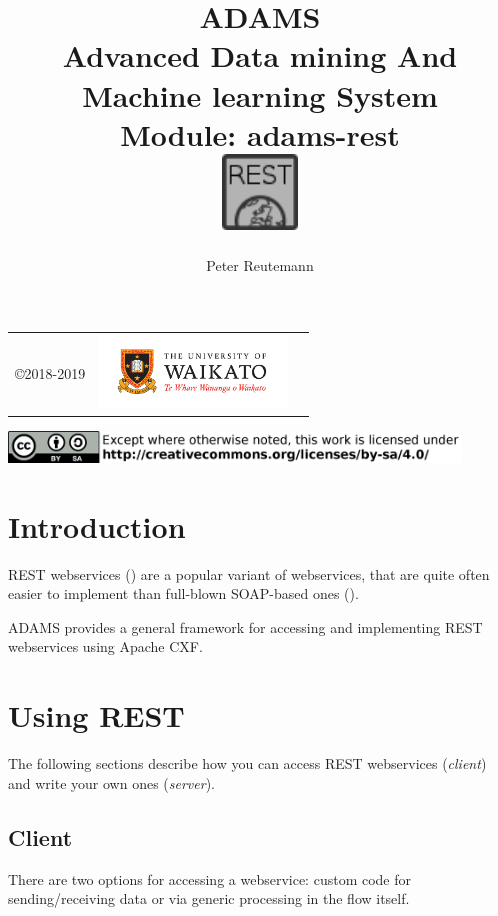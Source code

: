 \documentclass[a4paper]{book}
\title{
  \textbf{ADAMS} \\
  {\Large \textbf{A}dvanced \textbf{D}ata mining \textbf{A}nd \textbf{M}achine
  learning \textbf{S}ystem} \\
  {\Large Module: adams-rest} \\
  \vspace{1cm}
  \includegraphics[width=2cm]{images/rest-module.png} \\
}
\author{
  Peter Reutemann
}
\begin{document}
\begin{titlepage}
\maketitle

\thispagestyle{empty}
\center
\begin{table}[b]
	\begin{tabular}{c l l}
		\parbox[c][2cm]{2cm}{\copyright 2018-2019} &
		\parbox[c][2cm]{5cm}{\includegraphics[width=5cm]{images/coat_of_arms.pdf}} \\
	\end{tabular}
	\includegraphics[width=12cm]{images/cc.png} \\
\end{table}

\end{titlepage}

\tableofcontents

\chapter{Introduction}
REST webservices (\cite{rest}) are a popular variant of webservices, that
are quite often easier to implement than full-blown SOAP-based ones (\cite{soap}).

ADAMS provides a general framework for accessing and implementing REST webservices
using Apache CXF\cite{cxf}.

\chapter{Using REST}
The following sections describe how you can access REST webservices (\textit{client})
and write your own ones (\textit{server}).

\section{Client}
There are two options for accessing a webservice: custom code for sending/receiving
data or via generic processing in the flow itself.
\end{document}
